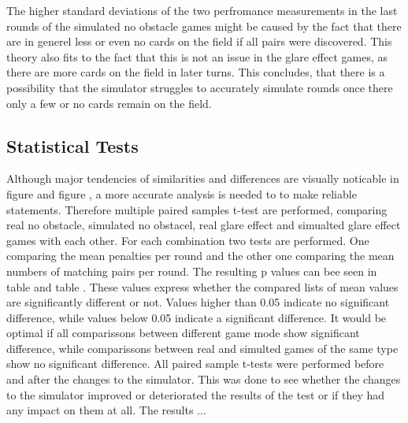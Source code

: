 The higher standard deviations of the two perfromance measurements in the last rounds of the simulated no obstacle games might be caused by the fact that there are in generel less or even no cards on the field if all pairs were discovered. This theory also fits to the fact that this is not an issue in the glare effect games, as there are more cards on the field in later turns. This concludes, that there is a possibility that the simulator struggles to accurately simulate rounds once there only a few or no cards remain on the field. 

\subsection{Statistical Tests}
Although major tendencies of similarities and differences are visually noticable in figure  and figure , a more accurate analysis is needed to to make reliable statements. Therefore multiple paired samples t-test are performed, comparing real no obstacle, simulated no obstacel, real glare effect and simualted glare effect games with each other. For each combination two tests are performed. One comparing the mean penalties per round and the other one comparing the mean numbers of matching pairs per round. The resulting p values can bee seen in table  and table . These values express whether the compared lists of mean values are significantly different or not. Values higher than 0.05 indicate no significant difference, while values below 0.05 indicate a significant difference. It would be optimal if all comparissons between different game mode show significant difference, while comparissons between real and simulted games of the same type show no significant difference. All paired sample t-tests were performed before and after the changes to the simulator. This was done to see whether the changes to the simulator improved or deteriorated the results of the test or if they had any impact on them at all. The results ... 




